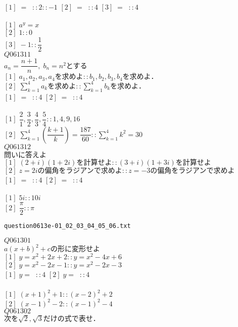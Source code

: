 \documentclass[10pt,dvipdfmx]{jarticle}
\begin{document}
$[1]\;=\;\;::2::-1$ 
$[2]\;=\;\;::4$ 
$[3]\;=\;\;::4$ 
\\
\\
$[1]\;a^y=x$\\
$[2]\;1::0$\\
$[3]\;-1::\dfrac{1}{2}$\\
$Q061311$\\
$a_n=\dfrac{n+1}{n},\;b_n=n^2\text{とする}$\\
$[1]\;a_1,a_2,a_3,a_4\text{を求めよ}::b_1,b_2,b_3,b_4\text{を求めよ．}$\\
$[2]\;\displaystyle\sum_{k=1}^{4} a_k\text{を求めよ}::\displaystyle\sum_{k=1}^{4} b_k\text{を求めよ．}$\\
$[1]\;=\;\;::4$ 
$[2]\;=\;\;::4$ 
\\
\\
$[1]\;\dfrac{2}{1},\dfrac{3}{2},\dfrac{4}{3},\dfrac{5}{4}::1,4,9,16$\\
$[2]\;\displaystyle\sum_{k=1}^{4} (\dfrac{k+1}{k})=\dfrac{187}{60}::\displaystyle\sum_{k=1}^{4} k^2=30$\\
$Q061312$\\
$\text{問いに答えよ}$\\
$[1]\;(2+i)(1+2i)\text{を計算せよ}::(3+i)(1+3i)\text{を計算せよ}$\\
$[2]\;z=2i\text{の偏角をラジアンで求めよ}::z=-3\text{の偏角をラジアンで求めよ}$\\
$[1]\;=\;\;::4$ 
$[2]\;=\;\;::4$ 
\\
\\
$[1]\;5i::10i$\\
$[2]\;\dfrac{{\pi}}{2}::{\pi}$\\
\newpage
\begin{center}
\verb|question0613e-01_02_03_04_05_06.txt|\\
\end{center}
$Q061301$\\
$a(x+b)^2+c\text{の形に変形せよ}$\\
$[1]\;y=x^2+2x+2::y=x^2-4x+6$\\
$[2]\;y=x^2-2x-1::y=x^2-2x-3$\\
$[1]\;y=\;\;::4$ 
$[2]\;y=\;\;::4$ 
\\
\\
$[1]\;(x+1)^2+1::(x-2)^2+2$\\
$[2]\;(x-1)^2-2::(x-1)^2-4$\\
$Q061302$\\
$\text{次を}\sqrt{2},\sqrt{3}\text{だけの式で表せ．}$\\
\end{document}
